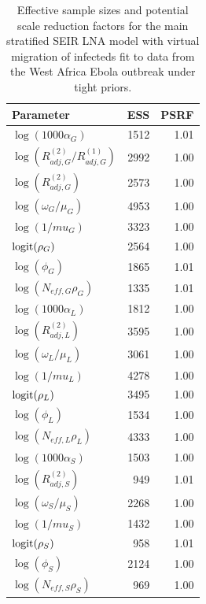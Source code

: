 \begin{table}[htbp]
	\caption{Effective sample sizes and potential scale reduction factors for the main stratified SEIR LNA model with virtual migration of infecteds fit to data from the West Africa Ebola outbreak under tight priors.}
	\centering\footnotesize
	\begin{tabular}{lrr}
		\hline
		\textbf{Parameter} & \textbf{ESS} & \textbf{PSRF} \\ 
		\hline
		$ \log(1000\alpha_G) $ & 1512 & 1.01 \\ 
		$ \log(R_{adj,G}^{(2)} / R_{adj,G}^{(1)}) $& 2992 & 1.00 \\ 
		$ \log(R_{adj,G}^{(2)}) $& 2573 & 1.00 \\ 
		$ \log(\omega_G/\mu_G) $ & 4953 & 1.00 \\ 
		$ \log(1/mu_G) $& 3323 & 1.00 \\ 
		$ \mathrm{logit}(\rho_G) $ & 2564 & 1.00 \\ 
		$ \log(\phi_G) $& 1865 & 1.01 \\ 
		$ \log(N_{eff,G}\rho_G) $& 1335 & 1.01 \\
		\hline 
		$ \log(1000\alpha_L) $ & 1812 & 1.00 \\ 
		$ \log(R_{adj,L}^{(2)}) $& 3595 & 1.00 \\ 
		$ \log(\omega_L/\mu_L) $ & 3061 & 1.00 \\ 
		$ \log(1/mu_L) $ & 4278 & 1.00 \\ 
		$ \mathrm{logit}(\rho_L) $ & 3495 & 1.00 \\ 
		$ \log(\phi_L) $ & 1534 & 1.00 \\ 
		$ \log(N_{eff,L}\rho_L) $ & 4333 & 1.00 \\ 
		\hline
		$ \log(1000\alpha_S) $ & 1503 & 1.00 \\ 
		$ \log(R_{adj,S}^{(2)}) $ & 949 & 1.01 \\ 
		$ \log(\omega_S/\mu_S) $ & 2268 & 1.00 \\ 
		$ \log(1/mu_S) $ & 1432 & 1.00 \\ 
		$ \mathrm{logit}(\rho_S) $ & 958 & 1.01 \\ 
		$ \log(\phi_S) $ & 2124 & 1.00 \\ 
		$ \log(N_{eff,S}\rho_S) $ & 969 & 1.00 \\ 
		\hline
	\end{tabular}
\end{table}

